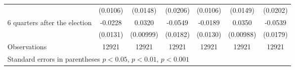 \begin{table}[!ht]
\begin{tabular}{l*{6}{c}}
                    &    (0.0106)         &    (0.0148)         &    (0.0206)         &    (0.0106)         &    (0.0149)         &    (0.0202)         \\
[0,5em]
 6 quarters after the election&     -0.0228         &      0.0320\sym{**} &     -0.0549\sym{**} &     -0.0189         &      0.0350\sym{***}&     -0.0539\sym{**} \\
                    &    (0.0131)         &   (0.00999)         &    (0.0182)         &    (0.0130)         &   (0.00988)         &    (0.0179)         \\
\hline
Observations        &       12921         &       12921         &       12921         &       12921         &       12921         &       12921         \\
\hline\hline
\multicolumn{7}{l}{\footnotesize Standard errors in parentheses \sym{*} \(p<0.05\), \sym{**} \(p<0.01\), \sym{***} \(p<0.001\)}\\
\end{tabular}
\end{table}
